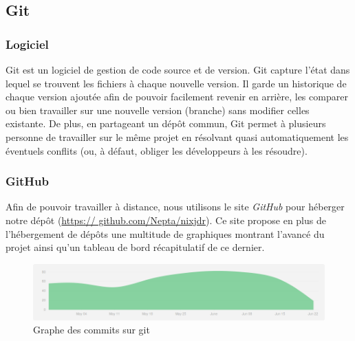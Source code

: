 \subsection{Git}
\subsubsection{Logiciel}
Git est un logiciel de gestion de code source et de version. Git capture l'état dans lequel se trouvent les fichiers à chaque nouvelle version. Il garde un historique de chaque version ajoutée afin de pouvoir facilement revenir en arrière, les comparer ou bien travailler sur une nouvelle version (branche) sans modifier celles existante. De plus, en partageant un dépôt commun, Git permet à plusieurs personne de travailler sur le même projet en résolvant quasi automatiquement les éventuels conflits (ou, à défaut, obliger les développeurs à les résoudre).

\subsubsection{GitHub}
Afin de pouvoir travailler à distance, nous utilisons le site \textit{GitHub} pour héberger notre dépôt (\href{https://github.com/Nepta/nixjdr}{https:// github.com/Nepta/nixjdr}).
Ce site propose en plus de l'hébergement de dépôts une multitude de graphiques montrant l'avancé du projet ainsi qu'un tableau de bord récapitulatif de ce dernier.

\begin{figure}[h!]
	\centering
	\includegraphics[width=\textwidth]{img/graph_commit.png}
	\caption{Graphe des commits sur git}
	\label{fig:commit}
\end{figure}
